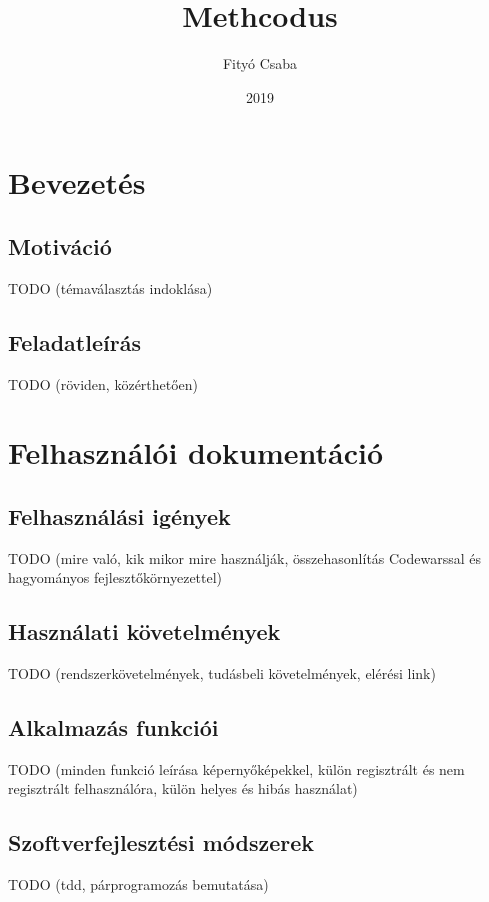 \documentclass{elteikthesis}
\title{Methcodus}
\date{2019}
\author{Fityó Csaba}
\affiliation{mesteroktató}
\begin{document}

	\maketitle

	\tableofcontents

	\chapter{Bevezetés}

		\section{Motiváció}
		TODO (témaválasztás indoklása)

		\section{Feladatleírás}
		TODO (röviden, közérthetően)

	\chapter{Felhasználói dokumentáció}

		\section{Felhasználási igények}
		TODO (mire való, kik mikor mire használják, összehasonlítás Codewarssal és hagyományos fejlesztőkörnyezettel)
		
		\section{Használati követelmények}
		TODO (rendszerkövetelmények, tudásbeli követelmények, elérési link)
		
		\section{Alkalmazás funkciói}
		TODO (minden funkció leírása képernyőképekkel, külön regisztrált és nem regisztrált felhasználóra, külön helyes és hibás használat)
		
		\section{Szoftverfejlesztési módszerek}
		TODO (tdd, párprogramozás bemutatása)
\end{document}
